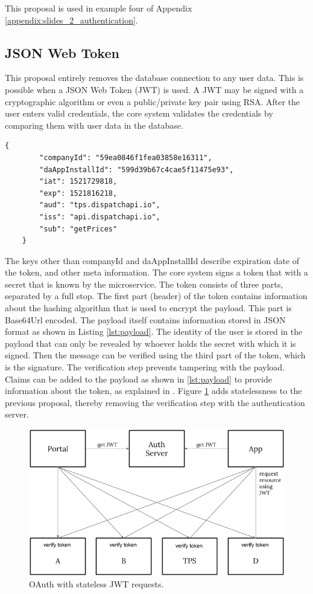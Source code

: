 This proposal is used in example four of Appendix \ref{appendix:slides_2_authentication}.

\subsection{JSON Web Token}
This proposal entirely removes the database connection to any user data. This is possible when a JSON Web Token (JWT) is used. A JWT may be signed with a cryptographic algorithm or even a public/private key pair using RSA. After the user enters valid credentials, the core system validates the credentials by comparing them with user data in the database.

\begin{center}
\noindent\begin{minipage}{.85\textwidth}
\begin{lstlisting}[caption={Two user identifiers and registered claim names stored inside the payload of a JSON web token.}, label={lst:payload}]
	{
		"companyId": "59ea0846f1fea03858e16311",
		"daAppInstallId": "599d39b67c4cae5f11475e93",
		"iat": 1521729818,
		"exp": 1521816218,
		"aud": "tps.dispatchapi.io",
		"iss": "api.dispatchapi.io",
		"sub": "getPrices"
	}
\end{lstlisting}
\end{minipage}
\end{center}

The keys other than companyId and daAppInstallId describe expiration date of the token, and other meta information. The core system signs a token that with a secret that is known by the microservice. The token consists of three parts, separated by a full stop. The first part (header) of the token contains information about the hashing algorithm that is used to encrypt the payload. This part is Base64Url encoded. The payload itself contains information stored in JSON format as shown in Listing \ref{lst:payload}. The identity of the user is stored in the payload that can only be revealed by whoever holds the secret with which it is signed. Then the message can be verified using the third part of the token, which is the signature. The verification step prevents tampering with the payload. Claims can be added to the payload as shown in \ref{lst:payload} to provide information about the token, as explained in \cite{JWT}. Figure \ref{fig:Auth2} adds statelessness to the previous proposal, thereby removing the verification step with the authentication server.

\begin{figure}[H]
	\centering
	\includegraphics[width=.7\textwidth]{Auth2}
	\caption[Stateless JWT]{OAuth with stateless JWT requests.}
	\label{fig:Auth2}
\end{figure}

